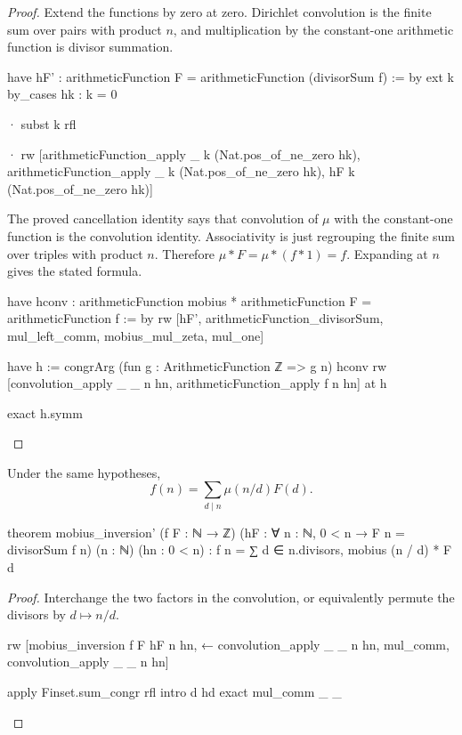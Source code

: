 \begin{proof}
  Extend the functions by zero at zero.
  Dirichlet convolution is the finite sum over pairs with product $n$, and multiplication by the
  constant-one arithmetic function is divisor summation.

  \begin{lean}
    have hF' : arithmeticFunction F = arithmeticFunction (divisorSum f) := by
      ext k
      by_cases hk : k = 0

      · subst k
        rfl

      · rw [arithmeticFunction_apply _ k (Nat.pos_of_ne_zero hk),
          arithmeticFunction_apply _ k (Nat.pos_of_ne_zero hk), hF k (Nat.pos_of_ne_zero hk)]
  \end{lean}

  The proved cancellation identity says that convolution of $\mu$ with the constant-one function
  is the convolution identity.
  Associativity is just regrouping the finite sum over triples with product $n$.
  Therefore $\mu*F=\mu*(f*1)=f$.
  Expanding at $n$ gives the stated formula.

  \begin{lean}
    have hconv : arithmeticFunction mobius * arithmeticFunction F = arithmeticFunction f := by
      rw [hF', arithmeticFunction_divisorSum, mul_left_comm, mobius_mul_zeta, mul_one]

    have h := congrArg (fun g : ArithmeticFunction ℤ => g n) hconv
    rw [convolution_apply _ _ n hn, arithmeticFunction_apply f n hn] at h

    exact h.symm
  \end{lean}
\end{proof}

\begin{theorem}
  \label{ent:thm:mobius-inversion-complement}
  Under the same hypotheses, \[ f(n)=\sum_{d\mid n}\mu(n/d)F(d). \]

  \begin{lean}
    theorem mobius_inversion' (f F : ℕ → ℤ)
        (hF : ∀ n : ℕ, 0 < n → F n = divisorSum f n) (n : ℕ) (hn : 0 < n) :
        f n = ∑ d ∈ n.divisors, mobius (n / d) * F d
  \end{lean}
\end{theorem}

\begin{proof}
  Interchange the two factors in the convolution, or equivalently permute the divisors by
  $d\mapsto n/d$.

  \begin{lean}
    rw [mobius_inversion f F hF n hn, ← convolution_apply _ _ n hn, mul_comm,
      convolution_apply _ _ n hn]

    apply Finset.sum_congr rfl
    intro d hd
    exact mul_comm _ _
  \end{lean}
\end{proof}

